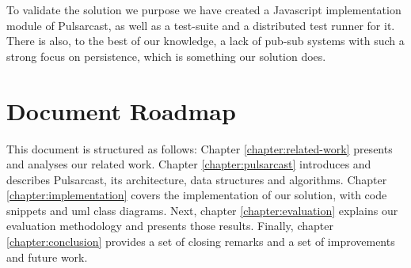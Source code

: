To validate the solution we purpose we have created a Javascript implementation
module of Pulsarcast, as well as a test-suite and a distributed test runner for
it. There is also, to the best of our knowledge, a lack of pub-sub systems with
such a strong focus on persistence, which is something our solution does.

\section{Document Roadmap}

This document is structured as follows: Chapter \ref{chapter:related-work}
presents and analyses our related work. Chapter \ref{chapter:pulsarcast}
introduces and describes Pulsarcast, its architecture, data structures and
algorithms. Chapter \ref{chapter:implementation} covers the implementation of
our solution, with code snippets and \acrshort{uml} class diagrams. Next,
chapter \ref{chapter:evaluation} explains our evaluation methodology and
presents those results. Finally, chapter \ref{chapter:conclusion} provides a
set of closing remarks and a set of improvements and future work.

